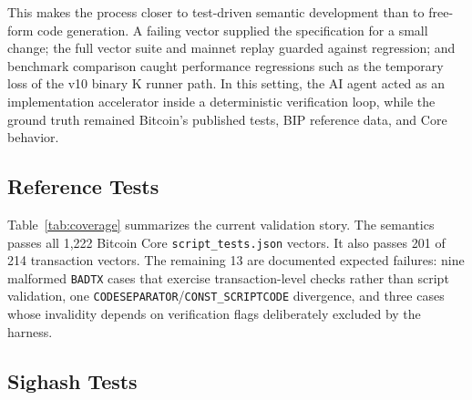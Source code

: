 \documentclass[conference]{IEEEtran}
\begin{document}
This makes the process closer to test-driven semantic development than to
free-form code generation.  A failing vector supplied the specification for a
small change; the full vector suite and mainnet replay guarded against
regression; and benchmark comparison caught performance regressions such as the
temporary loss of the v10 binary K runner path.  In this setting, the AI agent
acted as an implementation accelerator inside a deterministic verification
loop, while the ground truth remained Bitcoin's published tests, BIP reference
data, and Core behavior.

\subsection{Reference Tests}

Table~\ref{tab:coverage} summarizes the current validation story.  The
semantics passes all 1,222 Bitcoin Core \texttt{script\_tests.json} vectors.
It also passes 201 of 214 transaction vectors.  The remaining 13 are documented
expected failures: nine malformed \texttt{BADTX} cases that exercise
transaction-level checks rather than script validation, one
\texttt{CODESEPARATOR}/\texttt{CONST\_SCRIPTCODE} divergence, and three cases
whose invalidity depends on verification flags deliberately excluded by the
harness.

\begin{table}[htbp]
  \caption{Reference test coverage}
  \label{tab:coverage}
  \centering
  \footnotesize
\end{table}

\subsection{Sighash Tests}
\end{document}
